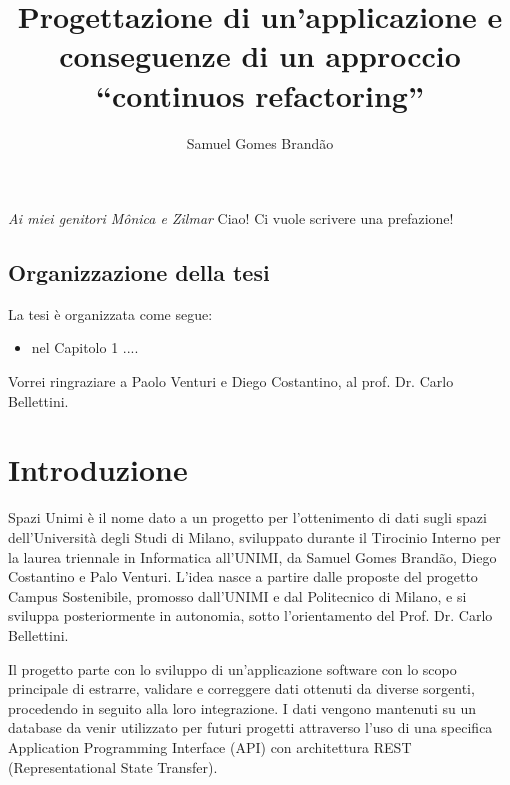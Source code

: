 \documentclass[12pt]{report}
\begin{document}
\title{Progettazione di un'applicazione e conseguenze di un approccio ``continuos refactoring''}
\author{Samuel Gomes Brandão}
%
% 
%
\beforepreface
\prefacesection{}
        {\hfill \Large {\sl Ai miei genitori Mônica e Zilmar}}
% 
%
Ciao! Ci vuole scrivere una prefazione!
%
%
\section*{Organizzazione della tesi}
\label{organizzazione}
La tesi \`e organizzata come segue:
\begin{itemize}
\item nel Capitolo 1 ....
\end{itemize}
%
%
Vorrei ringraziare a Paolo Venturi e Diego Costantino, 
al prof. Dr. Carlo Bellettini. 
\afterpreface


% 
% 
\chapter{Introduzione}
\label{cap1}

Spazi Unimi è il nome dato a un progetto per l’ottenimento di dati sugli spazi dell’Università degli Studi di Milano, sviluppato durante il Tirocinio Interno per la laurea triennale in Informatica all’UNIMI, da Samuel Gomes Brandão, Diego Costantino e Palo Venturi. L’idea nasce a partire dalle proposte del progetto Campus Sostenibile, promosso dall’UNIMI e dal Politecnico di Milano, e si sviluppa posteriormente in autonomia, sotto l’orientamento del Prof. Dr. Carlo Bellettini.

Il progetto parte con lo sviluppo di un'applicazione software con lo scopo principale di estrarre, validare e correggere dati ottenuti da diverse sorgenti, procedendo in seguito alla loro integrazione. I dati vengono mantenuti su un database da venir utilizzato per futuri progetti attraverso l’uso di una specifica Application Programming Interface (API) con architettura REST (Representational State Transfer). 
\end{document}
